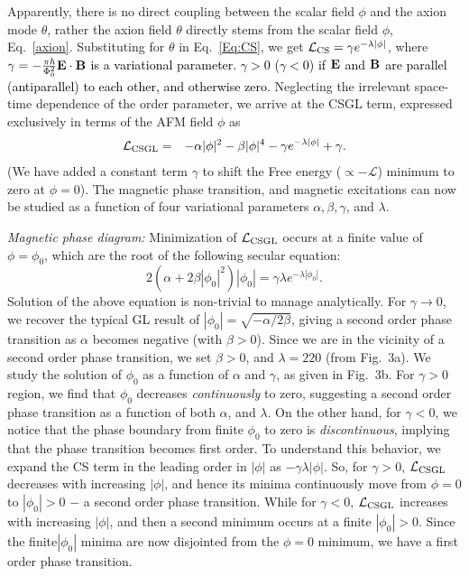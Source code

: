\documentclass[aps,prl,showpacs,twocolumn,groupedaddress]{revtex4-1}
\newcommand{\blue}{\textcolor{black}}
\begin{document}
Apparently, there is no direct coupling between the scalar field $\phi$ and the axion mode $\theta$, rather the axion field $\theta$ directly stems from the scalar field $\phi$, Eq.~\eqref{axion}. Substituting for $\theta$ in Eq.~\ref{Eq:CS}, we get $\mathcal{L}_{\rm CS}=\gamma e^{-\lambda|\phi|}$, where \blue{$\gamma=-\frac{\pi\hbar}{\Phi_0^2}{\bf E}\cdot{\bf B}$ is a variational parameter. $\gamma>0$ ($\gamma<0$) if ${\bf E}$ and ${\bf B}$ are parallel (antiparallel) to each other, and otherwise zero.} Neglecting the irrelevant space-time dependence of the order parameter, we arrive at the CSGL term, expressed exclusively in terms of the AFM field $\phi$ as
\begin{eqnarray}
\mathcal{L}_{\rm CSGL}&=&-\alpha|\phi|^2 - \beta|\phi|^4 - \gamma e^{-\lambda|\phi|} + \gamma.
\label{CSGL}
\end{eqnarray}
(We have added a constant term $\gamma$ to shift the Free energy ($\propto-\mathcal{L}$) minimum to zero at $\phi=0$). The magnetic phase transition, and magnetic excitations can now be studied as a function of four variational parameters $\alpha, \beta, \gamma$, and $\lambda$. 

{\it Magnetic phase diagram:} Minimization of $\mathcal{L}_{\rm CSGL}$ occurs at a finite value of $\phi=\phi_0$, which are the root of the following secular equation:
%
\begin{equation}
2\left(\alpha+2\beta|\phi_0|^2\right)|\phi_0| = \gamma\lambda e^{-\lambda|\phi_0|} .
\label{Eq:Lminimum}
\end{equation}
%
Solution of the above equation is non-trivial to manage analytically. For $\gamma\rightarrow 0$, we recover the typical GL result of $|\phi_0|=\sqrt{-\alpha/2\beta}$, giving a second order phase transition as $\alpha$ becomes negative (with $\beta>0$). Since we are in the vicinity of a second order phase transition, we set $\beta>0$, and $\lambda= 220$ (from Fig.~3a). We study the solution of $\phi_0$ as a function of $\alpha$ and $\gamma$, as given in Fig.~3b.  For $\gamma>0$ region, we find that $\phi_0$ decreases {\it continuously} to zero, suggesting a second order phase transition as a function of both $\alpha$, and $\lambda$. On the other hand, for $\gamma<0$, we notice that the phase boundary from finite $\phi_0$ to zero is {\it discontinuous}, implying that the phase transition becomes first order. To understand this behavior, we expand the CS term in the leading order in $|\phi|$ as $-\gamma\lambda|\phi|$. So, for $\gamma>0$, $\mathcal{L}_{\rm CSGL}$ decreases with increasing $|\phi|$, and hence its minima continuously move from $\phi=0$ to $|\phi_0|>0$ $-$ a second order phase transition. While for $\gamma<0$, $\mathcal{L}_{\rm CSGL}$ increases with increasing $|\phi|$, and then a second minimum occurs at a finite $|\phi_0|>0$. Since the finite$|\phi_0|$ minima are now disjointed from the $\phi=0$ minimum, we have a first order phase transition. 
\end{document}
